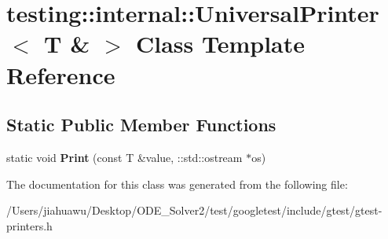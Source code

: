 \hypertarget{classtesting_1_1internal_1_1_universal_printer_3_01_t_01_6_01_4}{}\section{testing\+:\+:internal\+:\+:Universal\+Printer$<$ T \& $>$ Class Template Reference}
\label{classtesting_1_1internal_1_1_universal_printer_3_01_t_01_6_01_4}
\subsection*{Static Public Member Functions}
\begin{DoxyCompactItemize}
\item 
\mbox{\label{classtesting_1_1internal_1_1_universal_printer_3_01_t_01_6_01_4_a923a694be8aa66117848c1c5f57ede35}} 
static void {\bfseries Print} (const T \&value, \+::std\+::ostream $\ast$os)
\end{DoxyCompactItemize}


The documentation for this class was generated from the following file\+:\begin{DoxyCompactItemize}
\item 
/\+Users/jiahuawu/\+Desktop/\+O\+D\+E\+\_\+\+Solver2/test/googletest/include/gtest/gtest-\/printers.\+h\end{DoxyCompactItemize}
